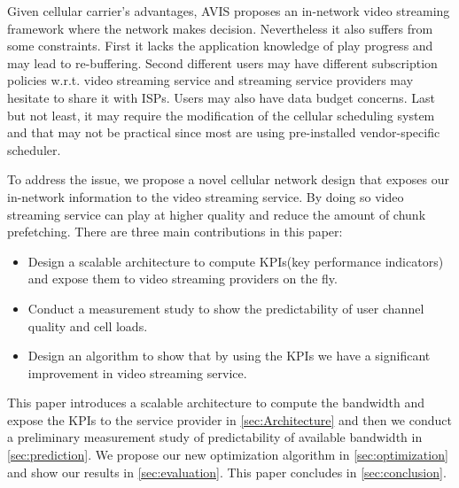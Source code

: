 Given cellular carrier's advantages, AVIS\cite{Avis} proposes an in-network video streaming framework where the network makes decision. 
Nevertheless it also suffers from some constraints. First it
lacks the application knowledge of play progress and may lead to re-buffering. 
Second different users may have different subscription
policies w.r.t. video streaming service and streaming service providers may
hesitate to share it with ISPs. Users may also have data budget concerns. Last
but not least, it may require the modification of the cellular scheduling system and that
may not be practical since most are using pre-installed
vendor-specific scheduler. 

To address the issue, we propose a novel cellular network design that exposes our in-network information to the video streaming service. By doing so video streaming service can play at higher quality and reduce the amount of chunk prefetching. There are three main contributions in this paper:
\begin{itemize}
\item Design a scalable architecture to compute KPIs(key performance indicators) and expose them to video streaming providers on the fly.
\item Conduct a measurement study to show the predictability of user channel quality and cell loads. 
\item Design an algorithm to show that by using the KPIs we have a significant improvement in video streaming service.
\end{itemize}

This paper introduces a scalable architecture to compute the bandwidth and expose the KPIs to the service provider in \autoref{sec:Architecture} and then we conduct a preliminary measurement study of predictability of available bandwidth in \autoref{sec:prediction}. We propose our new optimization algorithm in \autoref{sec:optimization} and show our results in \autoref{sec:evaluation}. This paper concludes in \autoref{sec:conclusion}. 


